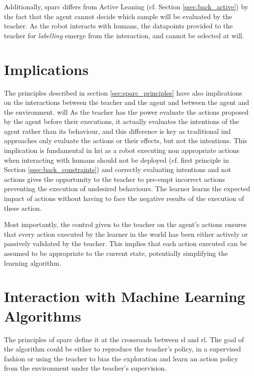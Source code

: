 Additionally, \gls{sparc} differs from Active Leaning (cf. Section \ref{ssec:back_active}) by the fact that the agent cannot decide which sample will be evaluated by the teacher. As the robot interacts with humans, the datapoints provided to the teacher for \textit{labelling} emerge from the interaction, and cannot be selected at will. 
    
\section{Implications}

The principles described in section \ref{sec:sparc_principles} have also implications on the interactions between the teacher and the agent and between the agent and the environment.
will
As the teacher has the power evaluate the actions proposed by the agent before their executions, it actually evaluates the intentions of the agent rather than its behaviour, and this difference is key as traditional \gls{iml} approaches only evaluate the actions or their effects, but not the intentions. This implication is fundamental in \gls{hri} as a robot executing non appropriate actions when interacting with humans should not be deployed (cf. first principle in Section \ref{ssec:back_constraints}) and correctly evaluating intentions and not actions gives the opportunity to the teacher to pre-empt incorrect actions preventing the execution of undesired behaviours. The  learner learns the expected impact of actions without having to face the negative results of the execution of these action.

Most importantly, the control given to the teacher on the agent's actions ensures that every action executed by the learner in the world has been either actively or passively validated by the teacher. This implies that each action executed can be assumed to be appropriate to the current state, potentially simplifying the learning algorithm.

\section{Interaction with Machine Learning Algorithms}

The principles of \gls{sparc} define it at the crossroads between \acrlong{sl} and \acrlong{rl}. The  goal of the algorithm could be either to reproduce the teacher's policy, in a supervised fashion or using the teacher to bias the exploration and learn an action policy from the environment under the teacher's supervision.

